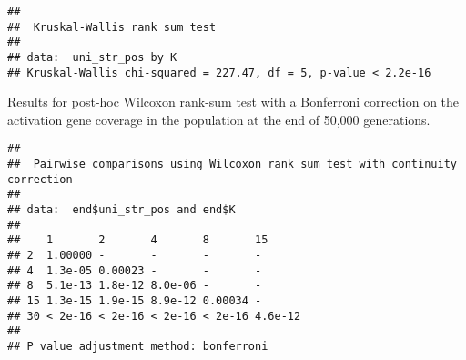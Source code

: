 \documentclass[]{book}
\newenvironment{Shaded}{\begin{snugshade}}{\end{snugshade}}
\newcommand{\DataTypeTok}[1]{\textcolor[rgb]{0.13,0.29,0.53}{#1}}
\newcommand{\KeywordTok}[1]{\textcolor[rgb]{0.13,0.29,0.53}{\textbf{#1}}}
\newcommand{\NormalTok}[1]{#1}
\newcommand{\OperatorTok}[1]{\textcolor[rgb]{0.81,0.36,0.00}{\textbf{#1}}}
\newcommand{\OtherTok}[1]{\textcolor[rgb]{0.56,0.35,0.01}{#1}}
\newcommand{\StringTok}[1]{\textcolor[rgb]{0.31,0.60,0.02}{#1}}
\begin{document}
\begin{verbatim}
## 
##  Kruskal-Wallis rank sum test
## 
## data:  uni_str_pos by K
## Kruskal-Wallis chi-squared = 227.47, df = 5, p-value < 2.2e-16
\end{verbatim}

Results for post-hoc Wilcoxon rank-sum test with a Bonferroni correction on the activation gene coverage in the population at the end of 50,000 generations.

\begin{Shaded}
\end{Shaded}

\begin{verbatim}
## 
##  Pairwise comparisons using Wilcoxon rank sum test with continuity correction 
## 
## data:  end$uni_str_pos and end$K 
## 
##    1       2       4       8       15     
## 2  1.00000 -       -       -       -      
## 4  1.3e-05 0.00023 -       -       -      
## 8  5.1e-13 1.8e-12 8.0e-06 -       -      
## 15 1.3e-15 1.9e-15 8.9e-12 0.00034 -      
## 30 < 2e-16 < 2e-16 < 2e-16 < 2e-16 4.6e-12
## 
## P value adjustment method: bonferroni
\end{verbatim}


\end{document}
